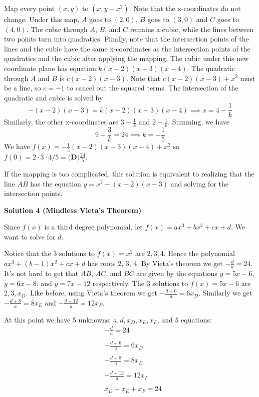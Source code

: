 \begin{enumerate}
Map every point $(x,y)$ to $(x, y - x^2)$. Note that the x-coordinates do not change. Under this map, $A$ goes to $(2,0)$, $B$ goes to $(3, 0)$ and $C$ goes to $(4,0)$. The cubic through $A$, $B$, and $C$ remains a cubic, while the lines between two points turn into quadratics. Finally, note that the intersection points of the lines and the cubic have the same x-coordinates as the intersection points of the quadratics and the cubic after applying the mapping. The cubic under this new coordinate plane has equation $k(x-2)(x-3)(x-4)$. The quadratic through $A$ and $B$ is $c(x-2)(x-3)$. Note that $c(x-2)(x-3) + x^2$ must be a line, so $c = -1$ to cancel out the squared terms. The intersection of the quadratic and cubic is solved by
 \[-(x-2)(x-3) = k(x-2)(x-3)(x-4) \implies x = 4 - \frac{1}{k}\]Similarly, the other x-coordinates are $3 - \frac{1}{k}$ and $2 - \frac{1}{k}$. Summing, we have
 \[9 - \frac{3}{k} = 24 \implies k = -\frac{1}{5}\]We have $f(x) = -\frac{1}{5} (x-2)(x-3)(x-4) + x^2$ so $f(0) = 2 \cdot 3 \cdot 4 / 5 = \boxed{\textbf{(D)}\frac{24}{5}}$.

 If the mapping is too complicated, this solution is equivalent to realizing that the line $AB$ has the equation $y = x^2 - (x-2)(x-3)$ and solving for the intersection points.

 



\textbf{Solution 4 (Mindless Vieta's Theorem)}

Since $f(x)$ is a third degree polynomial, let $f(x)=ax^3+bx^2+cx+d$. We want to solve for $d$. 

 Notice that the 3 solutions to $f(x)=x^2$ are $2, 3, 4$. Hence the polynomial $ax^3+(b-1)x^2+cx+d$ has roots 2, 3, 4. By Vieta's theorem we get $-\frac{d}{a}=24$. It's not hard to get that $AB$, $AC$, and $BC$ are given by the equations $y = 5x - 6$, $y= 6x-8$, and $y=7x-12$ respectively. The 3 solutions to $f(x)=5x-6$ are $2, 3, x_D$. Like before, using Vieta's theorem we get $-\frac{d+6}{a}=6x_D$. Similarly we get $-\frac{d+8}{a}=8x_E$ and $-\frac{d+12}{a}=12x_F$.

 At this point we have 5 unknowns: $a, d, x_D, x_E, x_F$, and 5 equations:\begin{align}& -\frac{d}{a}=24\\\\& -\frac{d+6}{a}=6x_D\\\\& -\frac{d+8}{a}=8x_E\\\\&-\frac{d+12}{a}=12x_F\\\\&x_D+x_E+x_F=24\end{align}


\end{enumerate}
